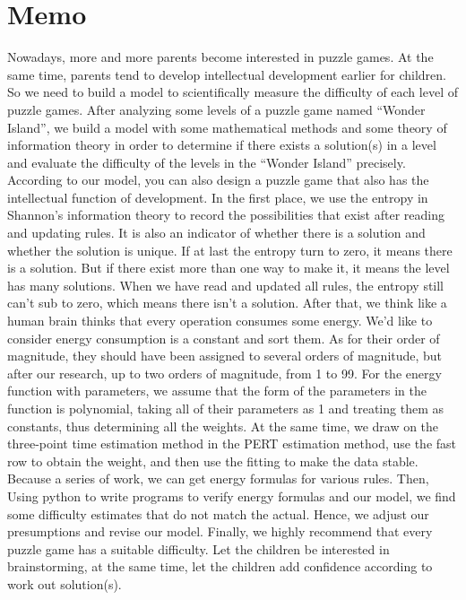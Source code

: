 \documentclass[12pt,a4paper,]{article}
\begin{document}
\section{Memo}
Nowadays, more and more parents become interested in puzzle games. At the same time, parents tend to develop intellectual development earlier for children. So we need to build a model to scientifically measure the difficulty of each level of puzzle games. After analyzing some levels of a puzzle game named “Wonder Island”, we build a model with some mathematical methods and some theory of information theory in order to determine if there exists a solution(s) in a level and evaluate the difficulty of the levels in the “Wonder Island” precisely. According to our model, you can also design a puzzle game that also has the intellectual function of development.
In the first place, we use the entropy in Shannon’s information theory to record the possibilities that exist after reading and updating rules. It is also an indicator of whether there is a solution and whether the solution is unique. If at last the entropy turn to zero, it means there is a solution. But if there exist more than one way to make it, it means the level has many solutions. When we have read and updated all rules, the entropy still can’t sub to zero, which means there isn’t a solution.
After that, we think like a human brain thinks that every operation consumes some energy. We’d like to consider energy consumption is a constant and sort them. As for their order of magnitude, they should have been assigned to several orders of magnitude, but after our research, up to two orders of magnitude, from 1 to 99. For the energy function with parameters, we assume that the form of the parameters in the function is polynomial, taking all of their parameters as 1 and treating them as constants, thus determining all the weights. At the same time, we draw on the three-point time estimation method in the PERT estimation method, use the fast row to obtain the weight, and then use the fitting to make the data stable. Because a series of work, we can get energy formulas for various rules.
Then, Using python to write programs to verify energy formulas and our model, we find some difficulty estimates that do not match the actual. Hence, we adjust our presumptions and revise our model.
Finally, we highly recommend that every puzzle game has a suitable difficulty. Let the children be interested in brainstorming, at the same time, let the children add confidence according to work out solution(s).
\end{document}
